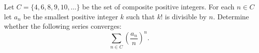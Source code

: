 Let \(C=\{4,6,8,9,10,\ldots\}\) be the set of composite positive integers. For each \(n\in C\) let \(a_n\) be the smallest positive integer \(k\) such that \(k!\) is divisible by \(n\). Determine whether the following series converges:
\[\sum_{n\in C}\left(\frac{a_n}{n}\right)^n.\]
